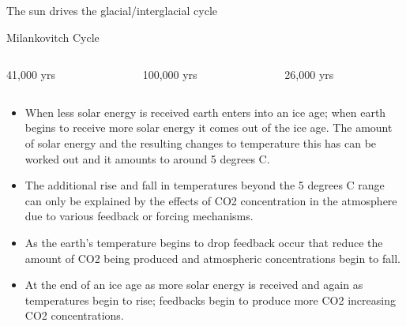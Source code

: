 \documentclass[hide notes,intlimits]{beamer}
\begin{document}
\begin{frame}{The sun drives the glacial/interglacial cycle}
  \vspace{-2cm}
  \begin{block}{Milankovitch Cycle}
    \begin{figure}
    \end{figure}
  \end{block}
  \begin{columns}[T]
    \begin{column}{.32\linewidth}
      41,000 yrs
    \end{column}
    \begin{column}{.32\linewidth}
      100,000 yrs
    \end{column}
    \begin{column}{.32\linewidth}
      26,000 yrs
    \end{column}
  \end{columns}
\end{frame}


\begin{frame}
  \begin{itemize}
  \item When less solar energy is received earth enters into an ice age; when earth begins to receive more solar energy it comes out of the ice age. The amount of solar energy and the resulting changes to temperature this has can be worked out and it amounts to around 5 degrees C.
  \item The additional rise and fall in temperatures beyond the 5 degrees C range can only be explained by the effects of CO2 concentration in the atmosphere due to various feedback or forcing mechanisms.
  \item As the earth's temperature begins to drop feedback occur that reduce the amount of CO2 being produced and atmospheric concentrations begin to fall.
  \item At the end of an ice age as more solar energy is received and again as temperatures begin to rise; feedbacks begin to produce more CO2 increasing CO2 concentrations.
  \end{itemize}
\end{frame}
\end{document}
